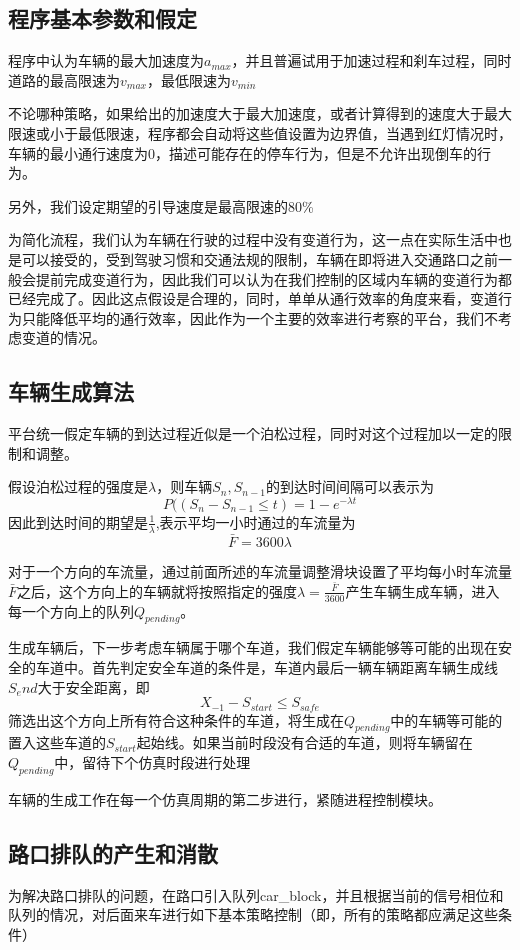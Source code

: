 \documentclass[UTF8,a4paper]{ctexart}
\begin{document}
\subsection{程序基本参数和假定}
程序中认为车辆的最大加速度为$a_{max}$，并且普遍试用于加速过程和刹车过程，同时道路的最高限速为$v_{max}$，最低限速为$v_{min}$

不论哪种策略，如果给出的加速度大于最大加速度，或者计算得到的速度大于最大限速或小于最低限速，程序都会自动将这些值设置为边界值，当遇到红灯情况时，车辆的最小通行速度为0，描述可能存在的停车行为，但是不允许出现倒车的行为。

另外，我们设定期望的引导速度是最高限速的80\%

为简化流程，我们认为车辆在行驶的过程中没有变道行为，这一点在实际生活中也是可以接受的，受到驾驶习惯和交通法规的限制，车辆在即将进入交通路口之前一般会提前完成变道行为，因此我们可以认为在我们控制的区域内车辆的变道行为都已经完成了。因此这点假设是合理的，同时，单单从通行效率的角度来看，变道行为只能降低平均的通行效率，因此作为一个主要的效率进行考察的平台，我们不考虑变道的情况。
\subsection{车辆生成算法}
平台统一假定车辆的到达过程近似是一个泊松过程，同时对这个过程加以一定的限制和调整。

假设泊松过程的强度是$\lambda$，则车辆$S_n,S_{n-1}$的到达时间间隔可以表示为
$$P((S_n-S_{n-1}\le t) = 1 - e^{-\lambda t}$$
因此到达时间的期望是$\frac{1}{\lambda}$,表示平均一小时通过的车流量为
$$\bar{F}=3600\lambda$$

对于一个方向的车流量，通过前面所述的车流量调整滑块设置了平均每小时车流量$\bar{F}$之后，这个方向上的车辆就将按照指定的强度$\lambda=\frac{\bar{F}}{3600}$产生车辆生成车辆，进入每一个方向上的队列$Q_{pending}$。


生成车辆后，下一步考虑车辆属于哪个车道，我们假定车辆能够等可能的出现在安全的车道中。首先判定安全车道的条件是，车道内最后一辆车辆距离车辆生成线$S_end$大于安全距离，即
$$X_{-1}-S_{start}\le S_{safe}$$
筛选出这个方向上所有符合这种条件的车道，将生成在$Q_{pending}$中的车辆等可能的置入这些车道的$S_{start}$起始线。如果当前时段没有合适的车道，则将车辆留在$Q_{pending}$中，留待下个仿真时段进行处理

车辆的生成工作在每一个仿真周期的第二步进行，紧随进程控制模块。
\subsection{路口排队的产生和消散}
为解决路口排队的问题，在路口引入队列car\_block，并且根据当前的信号相位和队列的情况，对后面来车进行如下基本策略控制（即，所有的策略都应满足这些条件）
\end{document}
